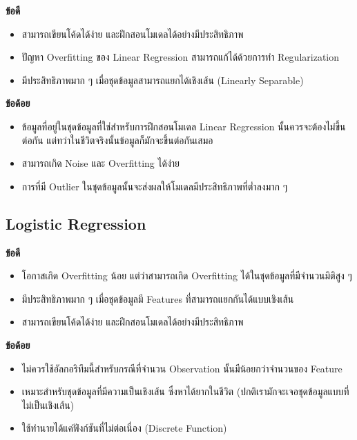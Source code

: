 \noindent \textbf{ข้อดี}
%
\begin{itemize}[topsep=0pt,noitemsep]\setlength\itemsep{0.5em}
    \item สามารถเขียนโค้ดได้ง่าย และฝึกสอนโมเดลได้อย่างมีประสิทธิภาพ
    
    \item ปัญหา Overfitting ของ Linear Regression สามารถแก้ได้ด้วยการทำ Regularization
    
    \item มีประสิทธิภาพมาก ๆ เมื่อชุดข้อมูลสามารถแยกได้เชิงเส้น (Linearly Separable)
\end{itemize}

\noindent \textbf{ข้อด้อย}
%
\begin{itemize}[topsep=0pt,noitemsep]\setlength\itemsep{0.5em}
    \item ข้อมูลที่อยู่ในชุดข้อมูลที่ใช่สำหรับการฝึกสอนโมเดล Linear Regression นั้นควรจะต้องไม่ขึ้นต่อกัน แต่ทว่าในชีวิตจริงนั้นข้อมูลก็มักจะขึ้นต่อกันเสมอ

    \item สามารถเกิด Noise และ Overfitting ได้ง่าย
    
    \item การที่มี Outlier ในชุดข้อมูลนั้นจะส่งผลให้โมเดลมีประสิทธิภาพที่ต่ำลงมาก ๆ
\end{itemize}

\subsection{Logistic Regression}
\label{ssec:pros_cons_log_reg}

\noindent \textbf{ข้อดี}
%
\begin{itemize}[topsep=0pt,noitemsep]\setlength\itemsep{0.5em}
    \item โอกาสเกิด Overfitting น้อย แต่ว่าสามารถเกิด Overfitting ได้ในชุดข้อมูลที่มีจำนวนมิติสูง ๆ
    
    \item มีประสิทธิภาพมาก ๆ เมื่อชุดข้อมูลมี Features ที่สามารถแยกกันได้แบบเชิงเส้น
    
    \item สามารถเขียนโค้ดได้ง่าย และฝึกสอนโมเดลได้อย่างมีประสิทธิภาพ
\end{itemize}

\noindent \textbf{ข้อด้อย}
%
\begin{itemize}[topsep=0pt,noitemsep]\setlength\itemsep{0.5em}
    \item ไม่ควรใช้อัลกอริทึมนี้สำหรับกรณีที่จำนวน Observation นั้นมีน้อยกว่าจำนวนของ Feature

    \item เหมาะสำหรับชุดข้อมูลที่มีความเป็นเชิงเส้น ซึ่งหาได้ยากในชีวิต (ปกติเรามักจะเจอชุดข้อมูลแบบที่ไม่เป็นเชิงเส้น)
    
    \item ใช้ทำนายได้แค่ฟังก์ชันที่ไม่ต่อเนื่อง (Discrete Function)
\end{itemize}

